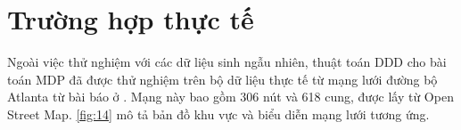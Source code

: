 \documentclass[../main.tex]{subfiles}
\begin{document}
\section{Trường hợp thực tế}\label{case-study}

Ngoài việc thử nghiệm với các dữ liệu sinh ngẫu nhiên, thuật toán DDD cho bài toán MDP đã được thử  
nghiệm trên bộ dữ liệu thực tế từ mạng lưới
đường bộ Atlanta từ bài báo ở \cite{he2022dynamic}. Mạng này bao gồm 306 nút và 618 cung, được lấy từ Open
Street Map. \autoref{fig:14} mô tả bản đồ khu vực và biểu diễn mạng lưới tương
ứng.

\end{document}
